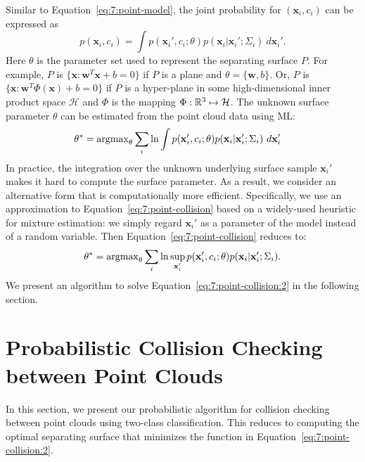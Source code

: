 Similar to Equation~\ref{eq:7:point-model}, the joint probability for $(\mathbf x_i, c_i)$ can be expressed as
\begin{equation}
p(\mathbf x_i, c_i) = \int p(\mathbf x_i', c_i; \theta) p(\mathbf x_i|\mathbf x_i'; \Sigma_i) \ d\mathbf x_i'.
\end{equation}
Here $\theta$ is the parameter set used to represent the separating surface $P$. For example, $P$ is $\{\mathbf x: \mathbf w^T \mathbf x + b = 0\}$ if $P$ is a plane and $\theta = \{\mathbf w, b\}$. Or, $P$ is $\{\mathbf x: \mathbf w^T \Phi(\mathbf x) + b = 0\}$ if $P$ is a hyper-plane in some high-dimensional inner product space $\mathcal H$ and $\Phi$ is the mapping $\Phi: \mathbb R^3 \mapsto \mathcal H$. The unknown surface parameter $\theta$ can be estimated from the point cloud data using ML:
\begin{equation}
\begin{aligned}
\label{eq:7:point-collision}
\theta^*
&= \operatorname{argmax}_{\theta} \sum_i \ln \int p(\mathbf x_i', c_i; \theta) p(\mathbf x_i|\mathbf x_i'; \Sigma_i) \ d\mathbf x_i'
\end{aligned}
\end{equation}
In practice, the integration over the unknown underlying surface sample $\mathbf x_i'$ makes it hard to compute the surface parameter. As a result,
we consider an alternative form that is computationally more efficient. Specifically, we use an approximation to Equation~\ref{eq:7:point-collision}
based on a widely-used heuristic for mixture estimation: we simply regard $\mathbf x_i'$ as a parameter of the model instead of a random variable. Then Equation~\ref{eq:7:point-collision} reduces to:
\begin{equation}
\label{eq:7:point-collision:2}
\theta^* = \operatorname{argmax}_{\theta} \sum_i \ln \sup_{\mathbf x_i'} p(\mathbf x_i', c_i; \theta) p(\mathbf x_i|\mathbf x_i'; \Sigma_i).
\end{equation}
We present an algorithm to solve Equation~\ref{eq:7:point-collision:2} in the following section.


\section{Probabilistic Collision Checking between Point Clouds}
\label{sec:7:algorithm}
In this section, we present our probabilistic algorithm for collision checking between point clouds using two-class classification. This reduces to computing the optimal separating surface that minimizes the function in Equation~\ref{eq:7:point-collision:2}.


